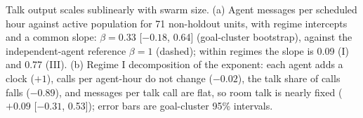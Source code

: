 \caption{Talk output scales sublinearly with swarm size. (a) Agent messages per scheduled hour against active population for 71 non-holdout units, with regime intercepts and a common slope: $\beta=0.33$ [$-0.18$, 0.64] (goal-cluster bootstrap), against the independent-agent reference $\beta=1$ (dashed); within regimes the slope is 0.09 (I) and 0.77 (III). (b) Regime I decomposition of the exponent: each agent adds a clock ($+1$), calls per agent-hour do not change ($-0.02$), the talk share of calls falls ($-0.89$), and messages per talk call are flat, so room talk is nearly fixed ($+0.09$ [$-0.31$, 0.53]); error bars are goal-cluster 95\% intervals.}
\label{fig:H85}
